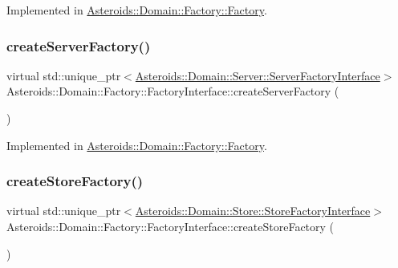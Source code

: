 Implemented in \hyperlink{classAsteroids_1_1Domain_1_1Factory_1_1Factory_abde97e85ba71b218eed2e3ff534a7d56}{Asteroids\+::\+Domain\+::\+Factory\+::\+Factory}.

\mbox{\label{classAsteroids_1_1Domain_1_1Factory_1_1FactoryInterface_a3425d5d2760883c62951a46268e6ddac}} 
\subsubsection{\texorpdfstring{create\+Server\+Factory()}{createServerFactory()}}
{\footnotesize\ttfamily virtual std\+::unique\+\_\+ptr$<$\hyperlink{classAsteroids_1_1Domain_1_1Server_1_1ServerFactoryInterface}{Asteroids\+::\+Domain\+::\+Server\+::\+Server\+Factory\+Interface}$>$ Asteroids\+::\+Domain\+::\+Factory\+::\+Factory\+Interface\+::create\+Server\+Factory (\begin{DoxyParamCaption}{ }\end{DoxyParamCaption})\hspace{0.3cm}{\ttfamily [pure virtual]}}



Implemented in \hyperlink{classAsteroids_1_1Domain_1_1Factory_1_1Factory_a7d3fd1dd5d6f0e44de2b4a57985b623b}{Asteroids\+::\+Domain\+::\+Factory\+::\+Factory}.

\mbox{\label{classAsteroids_1_1Domain_1_1Factory_1_1FactoryInterface_ae658038784c7e05435350f631f5e1924}} 
\subsubsection{\texorpdfstring{create\+Store\+Factory()}{createStoreFactory()}}
{\footnotesize\ttfamily virtual std\+::unique\+\_\+ptr$<$\hyperlink{classAsteroids_1_1Domain_1_1Store_1_1StoreFactoryInterface}{Asteroids\+::\+Domain\+::\+Store\+::\+Store\+Factory\+Interface}$>$ Asteroids\+::\+Domain\+::\+Factory\+::\+Factory\+Interface\+::create\+Store\+Factory (\begin{DoxyParamCaption}{ }\end{DoxyParamCaption})\hspace{0.3cm}{\ttfamily [pure virtual]}}



